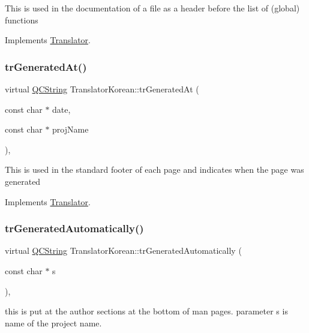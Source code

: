 This is used in the documentation of a file as a header before the list of (global) functions 

Implements \mbox{\hyperlink{class_translator}{Translator}}.

\mbox{\label{class_translator_korean_a5c01640bfb5c6f5667d56102539ce2e8}} 
\subsubsection{\texorpdfstring{trGeneratedAt()}{trGeneratedAt()}}
{\footnotesize\ttfamily virtual \mbox{\hyperlink{class_q_c_string}{Q\+C\+String}} Translator\+Korean\+::tr\+Generated\+At (\begin{DoxyParamCaption}\item[{const char $\ast$}]{date,  }\item[{const char $\ast$}]{proj\+Name }\end{DoxyParamCaption})\hspace{0.3cm}{\ttfamily [inline]}, {\ttfamily [virtual]}}

This is used in the standard footer of each page and indicates when the page was generated 

Implements \mbox{\hyperlink{class_translator}{Translator}}.

\mbox{\label{class_translator_korean_a162a5a02fc2ccdf4b7ccf923c0be64fc}} 
\subsubsection{\texorpdfstring{trGeneratedAutomatically()}{trGeneratedAutomatically()}}
{\footnotesize\ttfamily virtual \mbox{\hyperlink{class_q_c_string}{Q\+C\+String}} Translator\+Korean\+::tr\+Generated\+Automatically (\begin{DoxyParamCaption}\item[{const char $\ast$}]{s }\end{DoxyParamCaption})\hspace{0.3cm}{\ttfamily [inline]}, {\ttfamily [virtual]}}

this is put at the author sections at the bottom of man pages. parameter s is name of the project name. 

